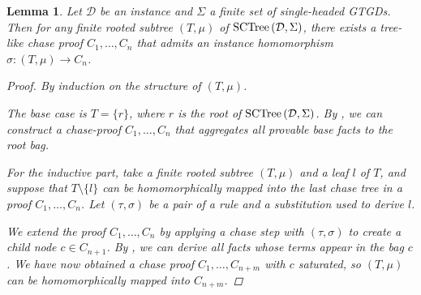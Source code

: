 \documentclass[12pt]{report}
\theoremstyle{plain}
\newtheorem{lemma}[theorem]{Lemma}
\theoremstyle{definition}
\newcommand{\SCTree}[2]{\ensuremath{\normalfont{\textrm{SCTree}} \left( #1, #2 \right)}}
\begin{document}
\begin{lemma}
\label{sctree-subtree-embeds-into-a-chase-proof}
  Let $\mathcal{D}$ be an instance and $\Sigma$ a finite set of single-headed GTGDs. Then for any finite rooted subtree $(T, \mu)$ of $\SCTree{\mathcal{D}}{\Sigma}$, there exists a tree-like chase proof $C_1, \ldots, C_n$ that admits an instance homomorphism $\sigma: (T, \mu) \rightarrow C_n$.
  \begin{proof}
    By induction on the structure of $(T, \mu)$.

    The base case is $T = \{r\}$, where $r$ is the root of $\SCTree{\mathcal{D}}{\Sigma}$. By , we can construct a chase-proof $C_1, \ldots, C_n$ that aggregates all provable base facts to the root bag.

    For the inductive part, take a finite rooted subtree $(T, \mu)$ and a leaf $l$ of $T$, and suppose that $T \setminus \{l\}$ can be homomorphically mapped into the last chase tree in a proof $C_1, \ldots, C_n$. Let $(\tau, \sigma)$ be a pair of a rule and a substitution used to derive $l$.
    
    We extend the proof $C_1, \ldots, C_n$ by applying a chase step with $(\tau, \sigma)$ to create a child node $c \in C_{n+1}$. By , we can derive all facts whose terms appear in the bag $c$. We have now obtained a chase proof $C_1, \ldots, C_{n+m}$ with $c$ saturated, so $(T, \mu)$ can be homomorphically mapped into $C_{n+m}$.
  \end{proof}
\end{lemma}
\end{document}
